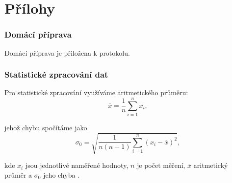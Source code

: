 \documentclass[english]{article}
\begin{document}
\part*{Přílohy}

\section{Domácí příprava}
	Domácí příprava je přiložena k protokolu.
\section{Statistické zpracování dat}

	Pro statistické zpracování využíváme aritmetického průměru:
	\begin{equation} \label{eq:aritmeticky_prumer}
	\overline{x} = \frac{1}{n}\sum\limits_{i=1}^{n}x_i,
	\end{equation}
%
%	
	
	
	jehož chybu spočítáme jako 
	\begin{equation} \label{eq:chyba_aritmetickeho_prumeru}
	\sigma_0 = \sqrt{\frac{1}{n(n-1)} \sum\limits_{i=1}^{n}\left( x_i - \overline{x} \right)^2 },
	\end{equation}
	
	kde $ x_i $ jsou jednotlivé naměřené hodnoty, $ n $ je počet měření, $ \overline{x} $ aritmetický průměr a $ \sigma_0 $ jeho chyba \cite{bib:chyby}.
	
%	
%	
\end{document}
